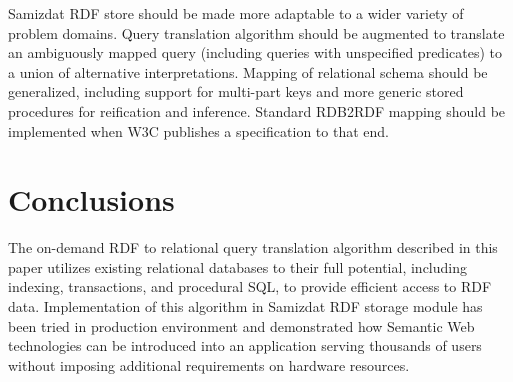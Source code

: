 \documentclass[conference,letterpaper]{IEEEtran}
\begin{document}
Samizdat RDF store should be made more adaptable to a wider variety of
problem domains. Query translation algorithm should be augmented to
translate an ambiguously mapped query (including queries with
unspecified predicates) to a union of alternative interpretations.
Mapping of relational schema should be generalized, including support
for multi-part keys and more generic stored procedures for reification
and inference. Standard RDB2RDF mapping should be implemented when W3C
publishes a specification to that end.


\section{Conclusions}

The on-demand RDF to relational query translation algorithm described
in this paper utilizes existing relational databases to their full
potential, including indexing, transactions, and procedural SQL, to
provide efficient access to RDF data. Implementation of this algorithm
in Samizdat RDF storage module has been tried in production environment
and demonstrated how Semantic Web technologies can be introduced into an
application serving thousands of users without imposing additional
requirements on hardware resources.

\vspace{1ex}
\end{document}
